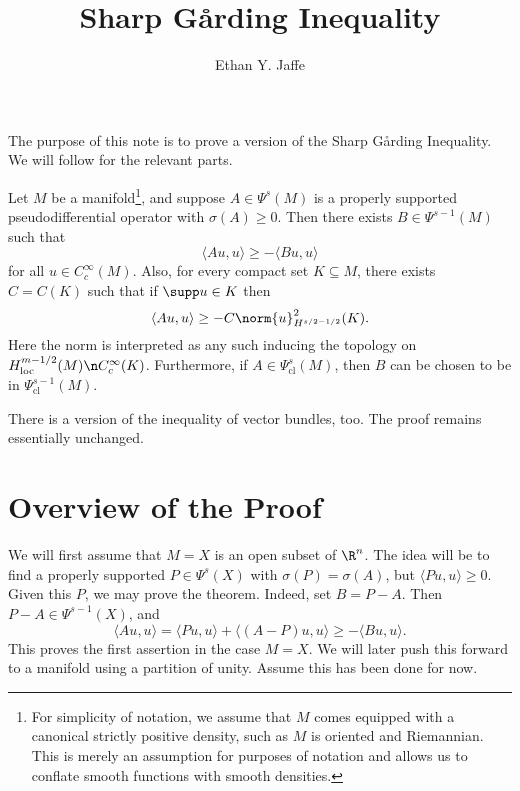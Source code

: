 \documentclass[12pt]{article}
\title{Sharp G\r{a}rding Inequality}
\author{Ethan Y. Jaffe}
\date{}
\begin{document}
\maketitle

\setcounter{section}{0}

The purpose of this note is to prove a version of the Sharp G\r{a}rding Inequality. We will follow \cite[Exercise~4.9]{GS} for the relevant parts.

\begin{thm}\label{ge}Let $M$ be a manifold\footnote{For simplicity  of notation, we assume that $M$ comes equipped with a canonical strictly positive density, such as $M$ is oriented and Riemannian. This is merely an assumption for purposes of notation and allows us to conflate smooth functions with smooth densities.}, and suppose $A \in \Psi^{s}(M)$ is a properly supported pseudodifferential operator with $\sigma(A) \geq 0$. Then there exists $B \in \Psi^{s-1}(M)$ such that
\[\langle Au,u\rangle \geq -\langle Bu,u\rangle\]
for all $u \in C_c^\infty(M)$. Also, for every compact set $K \subseteq M$, there exists $C = C(K)$ such that if $\supp u \in K$ then
\[\langle Au,u\rangle \geq -C\norm{u}^2_{H^{s/2-1/2}}(K).\]
Here the norm is interpreted as any such inducing the topology on $H^{m-1/2}_{\text{loc}}(M)\n C_c^\infty(K)$. Furthermore, if $A \in \Psi^{s}_{\text{cl}}(M)$, then $B$ can be chosen to be in $\Psi^{s-1}_{\text{cl}}(M)$. \end{thm}
\begin{rk}There is a version of the inequality of vector bundles, too. The proof remains essentially unchanged.\end{rk}

\section{Overview of the Proof}

We will first assume that $M=X$ is an open subset of $\R^n$. The idea will be to find a properly supported $P \in \Psi^{s}(X)$ with $\sigma(P) = \sigma(A)$, but $\langle Pu,u\rangle \geq 0$. Given this $P$, we may prove the theorem. Indeed, set $B = P-A$. Then $P-A \in \Psi^{s-1}(X)$, and
\[\langle Au,u\rangle = \langle Pu,u\rangle + \langle (A-P)u,u\rangle \geq -\langle Bu,u\rangle.\] This proves the first assertion in the case $M=X$. We will later push this forward to a manifold using a partition of unity. Assume this has been done for now.
\end{document}
